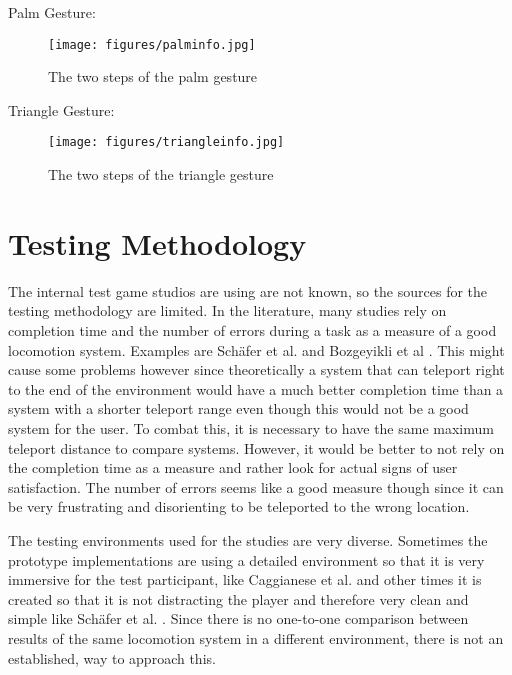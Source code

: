 Palm Gesture:
\begin{figure}[!ht]
    \centering
    \texttt{[image: figures/palminfo.jpg]}
    \caption{The two steps of the palm gesture}
    \label{fig:palmInfo}
\end{figure}

Triangle Gesture:
\begin{figure}[!ht]
    \centering
    \texttt{[image: figures/triangleinfo.jpg]}
    \caption{The two steps of the triangle gesture}
    \label{fig:triangleInfo}
\end{figure}

\section{Testing Methodology}
The internal test game studios are using are not known, so the sources for the testing methodology are limited. In the literature, many studies rely on completion time and the number of errors during a task as a measure of a good locomotion system. Examples are Schäfer et al. \cite{Schafer2021} and Bozgeyikli et al \cite{bozgeyikli}.
This might cause some problems however since theoretically a system that can teleport right to the end of the environment would have a much better completion time than a system with a shorter teleport range even though this would not be a good system for the user. To combat this, it is necessary to have the same maximum teleport distance to compare systems. However, it would be better to not rely on the completion time as a measure and rather look for actual signs of user satisfaction. The number of errors seems like a good measure though since it can be very frustrating and disorienting to be teleported to the wrong location. 

The testing environments used for the studies are very diverse. Sometimes the prototype implementations are using a detailed environment so that it is very immersive for the test participant, like Caggianese et al. \cite{Caggianese} and other times it is created so that it is not distracting the player and therefore very clean and simple like Schäfer et al. \cite{Schafer2021}.  
Since there is no one-to-one comparison between results of the same locomotion system in a different environment, there is not an established, way to approach this.

